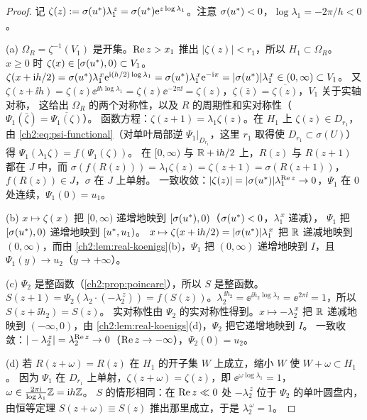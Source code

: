 \begin{proof}
记 $\zeta(z):=\sigma(u^{*})\lambda_1^{\,z}=\sigma(u^{*})\mathrm{e}^{z\log\lambda_1}$。注意 $\sigma(u^{*})<0$，$\log\lambda_1=-2\pi/h<0$。

(a) $\Omega_R=\zeta^{-1}(V_1)$ 是开集。$\operatorname{Re} z>x_1$ 推出 $|\zeta(z)|<r_1$，所以 $H_1\subset\Omega_R$。
$x\ge0$ 时 $\zeta(x)\in[\sigma(u^{*}),0)\subset V_1$。
$\zeta(x+\mathrm{i} h/2)=\sigma(u^{*})\lambda_1^{\,x}\mathrm{e}^{\mathrm{i}(h/2)\log\lambda_1}=\sigma(u^{*})\lambda_1^{\,x}\mathrm{e}^{-\mathrm{i}\pi}=|\sigma(u^{*})|\lambda_1^{\,x}\in(0,\infty)\subset V_1$。
又 $\zeta(z+\ii h)=\zeta(z)\ee^{\ii h\log\lambda_1}=\zeta(z)\ee^{-2\pi\ii}=\zeta(z)$，$\zeta(\bar z)=\overline{\zeta(z)}$，$V_1$ 关于实轴对称，
这给出 $\Omega_R$ 的两个对称性，以及 $R$ 的周期性和实对称性（$\Psi_1(\bar\zeta)=\overline{\Psi_1(\zeta)}$）。
函数方程：$\zeta(z+1)=\lambda_1\zeta(z)$。在 $H_1$ 上 $\zeta(z)\in D_{r_1}$，由 \eqref{ch2:eq:psi-functional}（对单叶局部逆 $\Psi_1|_{D_{r_1}}$，这里 $r_1$ 取得使 $D_{r_1}\subset\sigma(U)$）得 $\Psi_1(\lambda_1\zeta)=f(\Psi_1(\zeta))$。
在 $[0,\infty)$ 与 $\mathbb{R}+\mathrm{i} h/2$ 上，$R(z)$ 与 $R(z+1)$ 都在 $J$ 中，而 $\sigma(f(R(z)))=\lambda_1\zeta(z)=\zeta(z+1)=\sigma(R(z+1))$，$f(R(z))\in J$，$\sigma$ 在 $J$ 上单射。
一致收敛：$|\zeta(z)|=|\sigma(u^{*})|\lambda_1^{\operatorname{Re} z}\to0$，$\Psi_1$ 在 $0$ 处连续，$\Psi_1(0)=u_1$。

(b) $x\mapsto\zeta(x)$ 把 $[0,\infty)$ 递增地映到 $[\sigma(u^{*}),0)$（$\sigma(u^{*})<0$，$\lambda_1^{\,x}$ 递减），
$\Psi_1$ 把 $[\sigma(u^{*}),0)$ 递增地映到 $[u^{*},u_1)$。
$x\mapsto\zeta(x+\mathrm{i} h/2)=|\sigma(u^{*})|\lambda_1^{\,x}$ 把 $\mathbb{R}$ 递减地映到 $(0,\infty)$，而由 \cref{ch2:lem:real-koenigs}(b)，$\Psi_1$ 把 $(0,\infty)$ 递增地映到 $I$，且 $\Psi_1(y)\to u_2$（$y\to+\infty$）。

(c) $\Psi_2$ 是整函数（\cref{ch2:prop:poincare}），所以 $S$ 是整函数。
$S(z+1)=\Psi_2(\lambda_2\cdot(-\lambda_2^{\,z}))=f(S(z))$。$\lambda_2^{\,\ii h_2}=\ee^{\ii h_2\log\lambda_2}=\ee^{2\pi\ii}=1$，所以 $S(z+\ii h_2)=S(z)$。
实对称性由 $\Psi_2$ 的实对称性得到。$x\mapsto-\lambda_2^{\,x}$ 把 $\mathbb{R}$ 递减地映到 $(-\infty,0)$，由 \cref{ch2:lem:real-koenigs}(d)，$\Psi_2$ 把它递增地映到 $I$。
一致收敛：$|-\lambda_2^{\,z}|=\lambda_2^{\operatorname{Re} z}\to0$（$\operatorname{Re} z\to-\infty$），$\Psi_2(0)=u_2$。

(d) 若 $R(z+\omega)=R(z)$ 在 $H_1$ 的开子集 $W$ 上成立，缩小 $W$ 使 $W+\omega\subset H_1$。
因为 $\Psi_1$ 在 $D_{r_1}$ 上单射，$\zeta(z+\omega)=\zeta(z)$，即 $\ee^{\omega\log\lambda_1}=1$，$\omega\in\frac{2\pi\mathrm{i}}{\log\lambda_1}\mathbb{Z}=\mathrm{i} h\mathbb{Z}$。
$S$ 的情形相同：在 $\operatorname{Re} z\ll0$ 处 $-\lambda_2^{\,z}$ 位于 $\Psi_2$ 的单叶圆盘内，由恒等定理 $S(z+\omega)\equiv S(z)$ 推出那里成立，于是 $\lambda_2^{\,\omega}=1$。


\end{proof}
